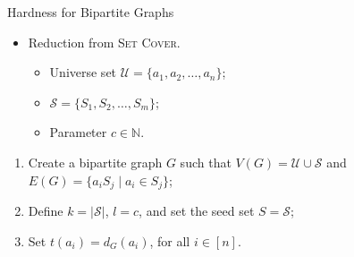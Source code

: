 \documentclass[10pt,aspectratio=169,english]{beamer}
\begin{document}
\begin{frame}{Hardness for Bipartite Graphs}
	\begin{itemize}
		\item Reduction from \textsc{Set Cover}.
		\begin{itemize}
			\item Universe set $\mathcal{U} = \{a_1, a_2, \dots, a_n\}$;
			\item $\mathcal{S} = \{S_1, S_2, \dots, S_m\}$;
			\item Parameter $c \in \mathbb{N}$.
		\end{itemize}
	\end{itemize}
	\begin{enumerate}
		\item Create a bipartite graph $G$ such that $V(G) = \mathcal{U} \cup \mathcal{S}$ and $E(G) = \{a_iS_j \mid a_i \in S_j\}$;
		\item Define $k = |\mathcal{S}|$, $l = c$, and set the seed set $S = \mathcal{S}$;
		\item Set $t(a_i) = d_G(a_i)$, for all $i \in [n]$.
	\end{enumerate}
\end{frame}
\end{document}
